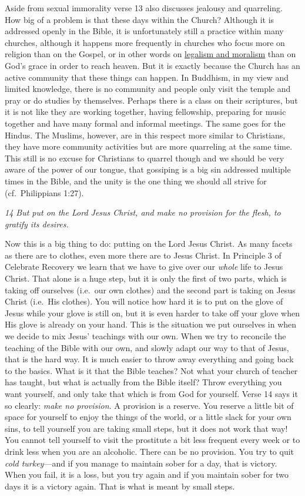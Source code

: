 Aside from sexual immorality verse 13 also discusses jealousy and
quarreling. How big of a problem is that these days within the Church?
Although it is addressed openly in the Bible, it is unfortunately still
a practice within many churches, although it happens more frequently in
churches who focus more on religion than on the Gospel, or in other
words on \href{https://www.gotquestions.org/moralism.html}{legalism and
moralism} than on God's grace in order to reach heaven. But it is
exactly because the Church has an active community that these things can
happen. In Buddhism, in my view and limited knowledge, there is no
community and people only visit the temple and pray or do studies by
themselves. Perhaps there is a class on their scriptures, but it is not
like they are working together, having fellowship, preparing for music
together and have many formal and informal meetings. The same goes for
the Hindus. The Muslims, however, are in this respect more similar to
Christians, they have more community activities but are more quarreling
at the same time. This still is no excuse for Christians to quarrel
though and we should be very aware of the power of our tongue, that
gossiping is a big sin addressed multiple times in the Bible, and the
unity is the one thing we should all strive for (cf.~Philippians 1:27).

\emph{14 But put on the Lord Jesus Christ, and make no provision for the
flesh, to gratify its desires.}

Now this is a big thing to do: putting on the Lord Jesus Christ. As many
facets as there are to clothes, even more there are to Jesus Christ. In
Principle 3 of Celebrate Recovery we learn that we have to give over our
\emph{whole} life to Jesus Christ. That alone is a huge step, but it is
only the first of two parts, which is taking off ourselves (i.e.~our own
clothes) and the second part is taking on Jesus Christ (i.e.~His
clothes). You will notice how hard it is to put on the glove of Jesus
while your glove is still on, but it is even harder to take off your
glove when His glove is already on your hand. This is the situation we
put ourselves in when we decide to mix Jesus' teachings with our own.
When we try to reconcile the teaching of the Bible with our own, and
slowly adapt our way to that of Jesus, that is the hard way. It is much
easier to throw away everything and going back to the basics. What is it
that the Bible teaches? Not what your church of teacher has taught, but
what is actually from the Bible itself? Throw everything you want
yourself, and only take that which is from God for yourself. Verse 14
says it so clearly: \emph{make no provision}. A provision is a reserve.
You reserve a little bit of space for yourself to enjoy the things of
the world, or a little slack for your own sins, to tell yourself you are
taking small steps, but it does not work that way! You cannot tell
yourself to visit the prostitute a bit less frequent every week or to
drink less when you are an alcoholic. There can be no provision. You try
to quit \emph{cold turkey}---and if you manage to maintain sober for a
day, that is victory. When you fail, it is a loss, but you try again and
if you maintain sober for two days it is a victory again. That is what
is meant by small steps.


